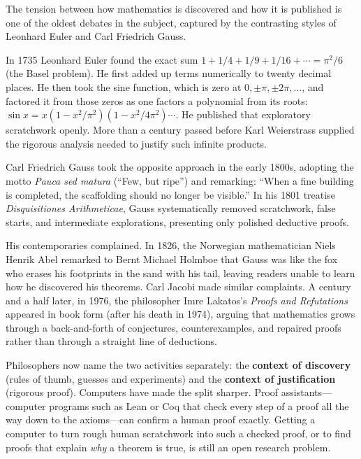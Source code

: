 \begin{historybox}
The tension between how mathematics is discovered and how it is published is one of the oldest debates in the subject, captured by the contrasting styles of Leonhard Euler and Carl Friedrich Gauss.

In 1735 Leonhard Euler found the exact sum $1 + 1/4 + 1/9 + 1/16 + \dotsb = \pi^2/6$ (the Basel problem). He first added up terms numerically to twenty decimal places. He then took the sine function, which is zero at $0, \pm \pi, \pm 2\pi, \dots$, and factored it from those zeros as one factors a polynomial from its roots: $\sin x = x(1 - x^2/\pi^2)(1 - x^2/4\pi^2) \dotsm$. He published that exploratory scratchwork openly. More than a century passed before Karl Weierstrass supplied the rigorous analysis needed to justify such infinite products.

Carl Friedrich Gauss took the opposite approach in the early 1800s, adopting the motto \emph{Pauca sed matura} (``Few, but ripe'') and remarking: ``When a fine building is completed, the scaffolding should no longer be visible.'' In his 1801 treatise \emph{Disquisitiones Arithmeticae}, Gauss systematically removed scratchwork, false starts, and intermediate explorations, presenting only polished deductive proofs.

His contemporaries complained. In 1826, the Norwegian mathematician Niels Henrik Abel remarked to Bernt Michael Holmboe that Gauss was like the fox who erases his footprints in the sand with his tail, leaving readers unable to learn how he discovered his theorems. Carl Jacobi made similar complaints. A century and a half later, in 1976, the philosopher Imre Lakatos's \emph{Proofs and Refutations} appeared in book form (after his death in 1974), arguing that mathematics grows through a back-and-forth of conjectures, counterexamples, and repaired proofs rather than through a straight line of deductions.

Philosophers now name the two activities separately: the \textbf{context of discovery} (rules of thumb, guesses and experiments) and the \textbf{context of justification} (rigorous proof). Computers have made the split sharper. Proof assistants---computer programs such as Lean or Coq that check every step of a proof all the way down to the axioms---can confirm a human proof exactly. Getting a computer to turn rough human scratchwork into such a checked proof, or to find proofs that explain \emph{why} a theorem is true, is still an open research problem.
\end{historybox}

